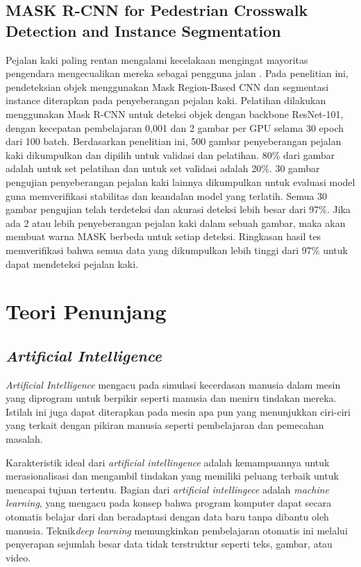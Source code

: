 \subsection{MASK R-CNN for Pedestrian Crosswalk Detection and Instance Segmentation}
\label{pedestrian-crosswalk}

Pejalan kaki paling rentan mengalami kecelakaan mengingat mayoritas pengendara mengecualikan mereka sebagai pengguna jalan \citep{pedestrian-crosswalk}. Pada penelitian ini, pendeteksian objek menggunakan Mask Region-Based CNN dan segmentasi instance diterapkan pada penyeberangan pejalan kaki. Pelatihan dilakukan menggunakan Mask R-CNN untuk deteksi objek dengan backbone ResNet-101, dengan kecepatan pembelajaran 0,001 dan 2 gambar per GPU selama 30 epoch dari 100 batch. Berdasarkan penelitian ini, 500 gambar penyeberangan pejalan kaki dikumpulkan dan dipilih untuk validasi dan pelatihan. 80\% dari gambar adalah untuk set pelatihan dan untuk set validasi adalah 20\%. 30 gambar pengujian penyeberangan pejalan kaki lainnya dikumpulkan untuk evaluasi model guna memverifikasi stabilitas dan keandalan model yang terlatih. Semua 30 gambar pengujian telah terdeteksi dan akurasi deteksi lebih besar dari 97\%. Jika ada 2 atau lebih penyeberangan pejalan kaki dalam sebuah gambar, maka akan membuat warna MASK berbeda untuk setiap deteksi. Ringkasan hasil tes memverifikasi bahwa semua data yang dikumpulkan lebih tinggi dari 97\% untuk dapat mendeteksi pejalan kaki.

\section{Teori Penunjang}
\label{sec:dasarteori}

\subsection{\textit{Artificial Intelligence}}
\label{subsec:artificial-itelligence}

\textit{Artificial Intelligence} mengacu pada simulasi kecerdasan manusia dalam mesin yang diprogram untuk berpikir seperti manusia dan meniru tindakan mereka.\citep{artificialintellingece} Istilah ini juga dapat diterapkan pada mesin apa pun yang menunjukkan ciri-ciri yang terkait dengan pikiran manusia seperti pembelajaran dan pemecahan masalah.

Karakteristik ideal dari \textit{artificial intellingence} adalah kemampuannya untuk merasionalisasi dan mengambil tindakan yang memiliki peluang terbaik untuk mencapai tujuan tertentu. Bagian dari \textit{artificial intellingece} adalah \textit{machine learning}, yang mengacu pada konsep bahwa program komputer dapat secara otomatis belajar dari dan beradaptasi dengan data baru tanpa dibantu oleh manusia. Teknik\textit{deep learning} memungkinkan pembelajaran otomatis ini melalui penyerapan sejumlah besar data tidak terstruktur seperti teks, gambar, atau video.

